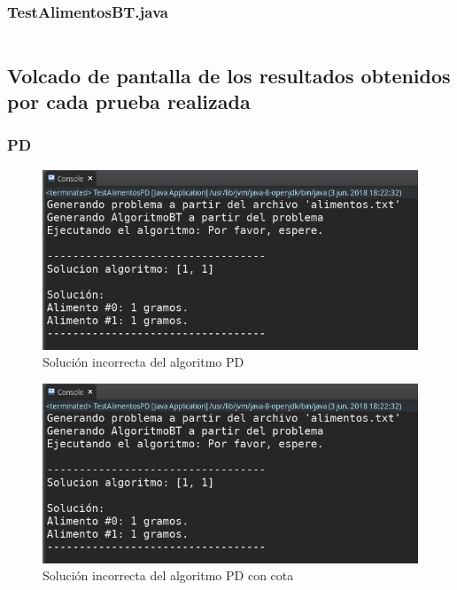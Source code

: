 \documentclass[a4paper,12pt]{article}
\begin{document}
\subsubsection{TestAlimentosBT.java}
\inputminted[fontsize=\footnotesize,breaklines]{java}{src/andalu30/PracticaIndividual2/bt/TestAlimentosBT.java}







\subsection{Volcado de pantalla de los resultados obtenidos por cada prueba realizada}
\subsubsection{PD}
\begin{figure}[H]
  \centering
  \includegraphics[scale=0.5]{pd.png}
  \caption{Solución incorrecta del algoritmo PD}
  \label{fig:pdsincota}
\end{figure}
\begin{figure}[H]
  \centering
  \includegraphics[scale=0.5]{pd.png}
  \caption{Solución incorrecta del algoritmo PD con cota}
  \label{fig:pdconcota}
\end{figure}
\end{document}

